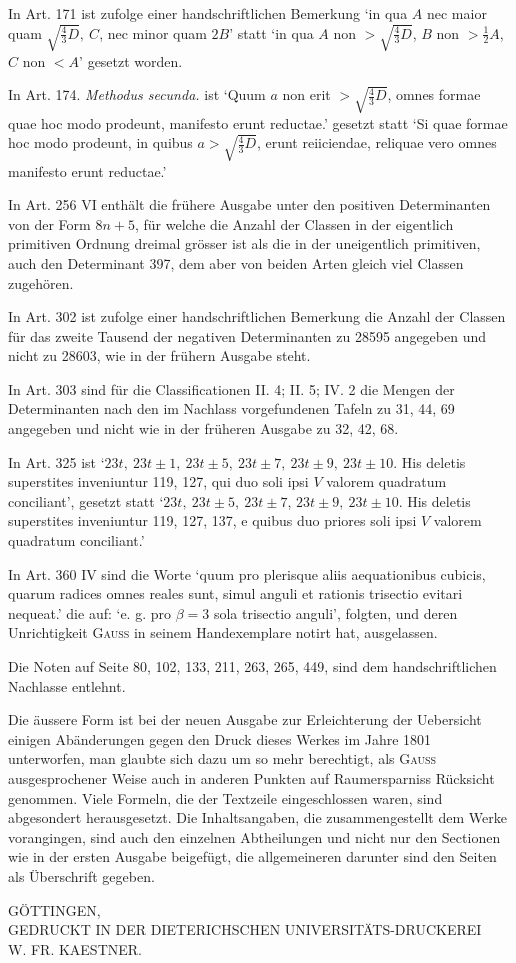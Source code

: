 In Art. 171 ist zufolge einer handschriftlichen Bemerkung ‘in qua \(A\) nec maior quam \(\surd{\frac43D},\allowbreak\ C\), nec minor quam \(2B\)’ statt ‘in qua \(A\) non \(>\surd{\frac43D}\), \(B\) non \(>\frac12A\), \(C\) non \(<A\)’ gesetzt worden.

In Art. 174. \textit{Methodus secunda.} ist ‘Quum \(a\) non erit \(>\surd{\frac43D}\), omnes formae quae hoc modo prodeunt, manifesto erunt reductae.’ gesetzt statt ‘Si quae formae hoc modo prodeunt, in quibus \(a>\surd{\frac43D}\), erunt reiiciendae, reliquae vero omnes manifesto erunt reductae.’

In Art. 256 VI enthält die frühere Ausgabe unter den positiven Determinanten von der Form \(8n+5\), für welche die Anzahl der Classen in der eigentlich primitiven Ordnung dreimal grösser ist als die in der uneigentlich primitiven, auch den Determinant 397, dem aber von beiden Arten gleich viel Classen zugehören.

In Art. 302 ist zufolge einer handschriftlichen Bemerkung die Anzahl der Classen für das zweite Tausend der negativen Determinanten zu 28595 angegeben und nicht zu 28603, wie in der frühern Ausgabe steht.

In Art. 303 sind für die Classificationen II. 4; II. 5; IV. 2 die Mengen der Determinanten nach den im Nachlass vorgefundenen Tafeln zu 31, 44, 69 angegeben und nicht wie in der früheren Ausgabe zu 32, 42, 68.

In Art. 325 ist ‘\(23t,\allowbreak\ 23t\pm1,\allowbreak\ 23t\pm5,\allowbreak\ 23t\pm7,\allowbreak\ 23t\pm9,\allowbreak\ 23t\pm10\). His deletis superstites inveniuntur 119, 127, qui duo soli ipsi \(V\) valorem quadratum conciliant’, gesetzt statt ‘\(23t,\allowbreak\ 23t\pm5,\allowbreak\ 23t\pm7\), \(23t\pm9,\allowbreak\ 23t\pm10\). His deletis superstites inveniuntur 119, 127, 137, e quibus duo priores soli ipsi \(V\) valorem quadratum conciliant.’

In Art. 360 IV sind die Worte ‘quum pro plerisque aliis aequationibus cubicis, quarum radices omnes reales sunt, simul anguli et rationis trisectio evitari nequeat.’ die auf: ‘e. g. pro \(\beta=3\) sola trisectio anguli’, folgten, und deren Unrichtigkeit \textsc{Gauss} in seinem Handexemplare notirt hat, ausgelassen.

Die Noten auf Seite 80, 102, 133, 211, 263, 265, 449, sind dem handschriftlichen Nachlasse entlehnt.

Die äussere Form ist bei der neuen Ausgabe zur Erleichterung der Uebersicht einigen Abänderungen gegen den Druck dieses Werkes im Jahre 1801 unterworfen, man glaubte sich dazu um so mehr berechtigt, als \textsc{Gauss} ausgesprochener Weise auch in anderen Punkten auf Raumersparniss Rücksicht genommen. Viele Formeln, die der Textzeile eingeschlossen waren, sind abgesondert herausgesetzt. Die Inhaltsangaben, die zusammengestellt dem Werke vorangingen, sind auch den einzelnen Abtheilungen und nicht nur den Sectionen wie in der ersten Ausgabe beigefügt, die allgemeineren darunter sind den Seiten als Überschrift gegeben.

\BookRule{45mm}

\begin{center}\small GÖTTINGEN,\\ GEDRUCKT IN DER DIETERICHSCHEN UNIVERSITÄTS-DRUCKEREI\\ W. FR. KAESTNER.\end{center}
